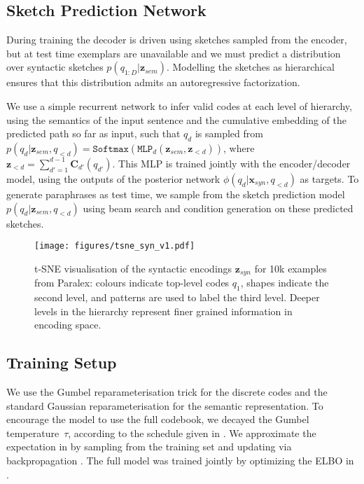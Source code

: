 \documentclass[11pt]{article}
\begin{document}
\subsection{Sketch Prediction Network}

During training the decoder is driven using sketches sampled from the encoder, but at test time exemplars are unavailable and we must predict a distribution over syntactic sketches $p(q_{1:D} |\textbf{z}_{sem})$. Modelling the sketches as hierarchical ensures that this distribution admits an autoregressive factorization.



We use a simple recurrent network to infer valid codes at each level of hierarchy, using the semantics of the input sentence and the cumulative embedding of the predicted path so far as input, such that
$q_d$ is sampled from  $p(q_d |\textbf{z}_{sem}, q_{< d}) = \texttt{Softmax}(\texttt{MLP}_d(\textbf{z}_{sem}, \textbf{z}_{<d}))$, where $\textbf{z}_{<d} = \sum\limits_{d'=1}^{d-1} \textbf{C}_{d'}(q_{d'})$. This MLP is trained jointly with the encoder/decoder model, using the outputs of the posterior network $\phi(q_d |
\textbf{x}_{syn}, q_{< d})$ as targets.
To generate paraphrases as test time, we sample from the sketch prediction model $p(q_d |\textbf{z}_{sem}, q_{< d})$ using beam search and condition generation on these predicted sketches.





\begin{figure*}[ht!]
    \centering
    \texttt{[image: figures/tsne\_syn\_v1.pdf]}
\caption{t-SNE visualisation of the syntactic encodings $\textbf{z}_{syn}$ for 10k examples from Paralex: colours indicate top-level codes $q_1$, shapes indicate the second level, and patterns are used to label the third level. Deeper levels in the hierarchy represent finer grained information in encoding space.}
    \vspace{-0.4cm}
    \label{fig:tsne}
\end{figure*}


\subsection{Training Setup}
\label{sec:training}

We use the Gumbel reparameterisation trick
\cite{jang2016categorical,maddison2017concrete,sonderby2017continuous}
for the discrete codes and the standard Gaussian reparameterisation
for the semantic representation. To encourage the model to use the full codebook, we decayed the Gumbel temperature~$\tau$, according to the schedule given in . We approximate the expectation in
 by sampling from the training set and
updating via backpropagation \cite{kingma2013autoencoding}. The full model was trained jointly by optimizing the ELBO in .
\end{document}
